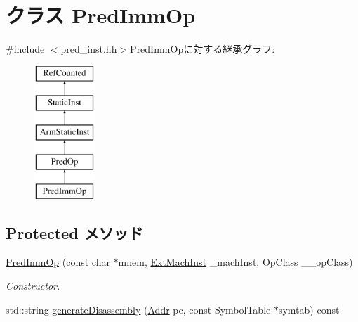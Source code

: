 \hypertarget{classArmISA_1_1PredImmOp}{
\section{クラス PredImmOp}
\label{classArmISA_1_1PredImmOp}
}


{\ttfamily \#include $<$pred\_\-inst.hh$>$}PredImmOpに対する継承グラフ:\begin{figure}[H]
\begin{center}
\leavevmode
\includegraphics[height=5cm]{classArmISA_1_1PredImmOp}
\end{center}
\end{figure}
\subsection*{Protected メソッド}
\begin{DoxyCompactItemize}
\item 
\hyperlink{classArmISA_1_1PredImmOp_af3f7b8ce652d04ba2d7b5742d3442a12}{PredImmOp} (const char $\ast$mnem, \hyperlink{classStaticInst_a5605d4fc727eae9e595325c90c0ec108}{ExtMachInst} \_\-machInst, OpClass \_\-\_\-opClass)
\begin{DoxyCompactList}\small\item\em Constructor. \item\end{DoxyCompactList}\item 
std::string \hyperlink{classArmISA_1_1PredImmOp_a95d323a22a5f07e14d6b4c9385a91896}{generateDisassembly} (\hyperlink{classm5_1_1params_1_1Addr}{Addr} pc, const SymbolTable $\ast$symtab) const 
\end{DoxyCompactItemize}
